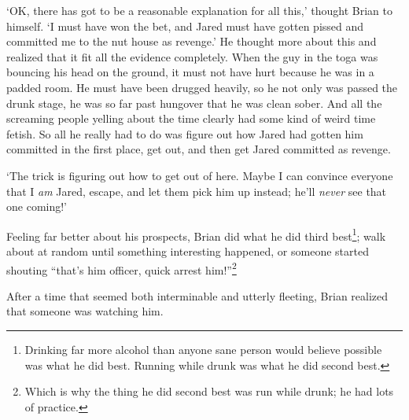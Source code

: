`OK, there has got to be a reasonable explanation for all this,' thought Brian
to himself.  `I must have won the bet, and Jared must have gotten pissed and
committed me to the nut house as revenge.' He thought more about this and
realized that it fit all the evidence completely. When the guy in the toga was
bouncing his head on the ground, it must not have hurt because he was in a
padded room.  He must have been drugged heavily, so he not only was passed the
drunk stage, he was so far past hungover that he was clean sober.  And all the
screaming people yelling about the time clearly had some kind of weird time
fetish.  So all he really had to do was figure out how Jared had gotten him
committed in the first place, get out, and then get Jared committed as revenge.

`The trick is figuring out how to get out of here.  Maybe I can convince
everyone that I \emph{am} Jared, escape, and let them pick him up instead; he'll
\emph{never} see that one coming!'

Feeling far better about his prospects, Brian did what he did third
best\footnote{Drinking far more alcohol than anyone sane person would believe
possible was what he did best.  Running while drunk was what he did second
best.}; walk about at random until something interesting happened, or someone
started shouting ``that's him officer, quick arrest him!''\footnote{Which is why
the thing he did second best was run while drunk; he had lots of practice.}

After a time that seemed both interminable and utterly fleeting, Brian realized
that someone was watching him.
